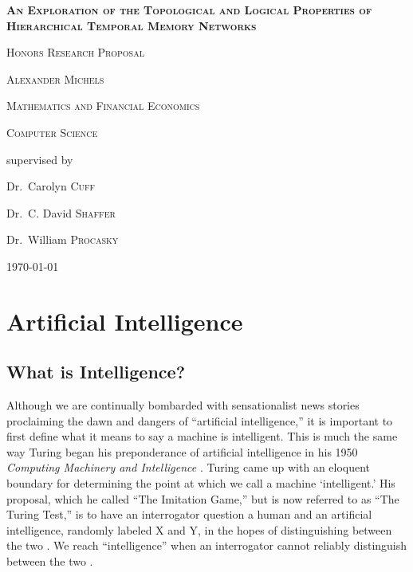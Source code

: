 \documentclass[fleqn,notitlepage,minimal]{article}
\begin{document}
	\begin{titlepage}
		\centering
		{\scshape\LARGE \textbf{An Exploration of the Topological and Logical Properties of Hierarchical Temporal Memory Networks} \par}
		{\scshape\LARGE Honors Research Proposal \par}
		\vspace{1cm}
		{\scshape\Large Alexander Michels\par}
		\vspace{0.5cm}
		{\scshape\Large Mathematics and Financial Economics\par}
		\vspace{0.5cm}
		{\scshape\Large Computer Science\par}
		\vspace{1cm}
		\vfill \large
		supervised by\par
		Dr.~Carolyn \textsc{Cuff}\par
		Dr.~C. David \textsc{Shaffer}\par
		Dr.~William \textsc{Procasky}\par
		
		\vfill
		
		{\large \today\par}
	\end{titlepage}
	
	\tableofcontents
	
	\newpage
	
	\section{Artificial Intelligence}
	
	\subsection{What is Intelligence?}
	
	Although we are continually bombarded with sensationalist news stories proclaiming the dawn and dangers of ``artificial intelligence,'' it is important to first define what it means to say a machine is intelligent. This is much the same way Turing began his preponderance of artificial intelligence in his 1950 \textit{Computing Machinery and Intelligence} \cite{Turing}. Turing came up with an eloquent boundary for determining the point at which we call a machine `intelligent.' His proposal, which he called ``The Imitation Game,'' but is now referred to as ``The Turing Test,'' is to have an interrogator question a human and an artificial intelligence, randomly labeled X and Y, in the hopes of distinguishing between the two \cite{Turing}. We reach ``intelligence'' when an interrogator cannot reliably distinguish between the two \cite{Turing}.
	
\end{document}
